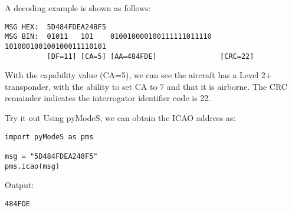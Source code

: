 A decoding example is shown as follows:

\begin{verbatim}
MSG HEX:  5D484FDEA248F5
MSG BIN:  01011   101    010010000100111111011110  101000100100100011110101
          [DF=11] [CA=5] [AA=484FDE]               [CRC=22]
\end{verbatim}

With the capability value (CA=5), we can see the aircraft has a Level 2+ transponder, with the ability to set CA to 7 and that it is airborne. The CRC remainder indicates the interrogator identifier code is 22.

\begin{notebox}{Try it out}
Using pyModeS, we can obtain the ICAO address as: 

\begin{verbatim}
import pyModeS as pms

msg = "5D484FDEA248F5"
pms.icao(msg)
\end{verbatim}

Output: 

\begin{verbatim}
484FDE
\end{verbatim}

\end{notebox}